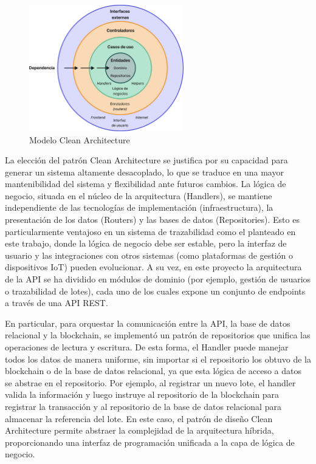 \begin{figure}[!htb]
\centering
\includegraphics[width=0.6\textwidth]{Figures/clean-architecture.png}
\caption{Modelo Clean Architecture}
\label{fig:clean-architecture}
\end{figure}

La elección del patrón Clean Architecture se justifica por su capacidad para generar un sistema altamente desacoplado, lo que se traduce en una mayor mantenibilidad del sistema y flexibilidad ante futuros cambios. La lógica de negocio, situada en el núcleo de la arquitectura (Handlers), se mantiene independiente de las tecnologías de implementación (infraestructura), la presentación de los datos (Routers) y las bases de datos (Repositories). Esto es particularmente ventajoso en un sistema de trazabilidad como el planteado en este trabajo, donde la lógica de negocio debe ser estable, pero la interfaz de usuario y las integraciones con otros sistemas (como plataformas de gestión o dispositivos IoT) pueden evolucionar. A su vez, en este proyecto la arquitectura de la API se ha dividido en módulos de dominio (por ejemplo, gestión de usuarios o trazabilidad de lotes), cada uno de los cuales expone un conjunto de endpoints a través de una API REST.

En particular, para orquestar la comunicación entre la API, la base de datos relacional y la blockchain, se implementó un patrón de repositorios que unifica las operaciones de lectura y escritura. De esta forma, el Handler puede manejar todos los datos de manera uniforme, sin importar si el repositorio los obtuvo de la blockchain o de la base de datos relacional, ya que esta lógica de acceso a datos se abstrae en el repositorio. Por ejemplo, al registrar un nuevo lote, el handler valida la información y luego instruye al repositorio de la blockchain para registrar la transacción y al repositorio de la base de datos relacional para almacenar la referencia del lote. En este caso, el patrón de diseño Clean Architecture permite abstraer la complejidad de la arquitectura híbrida, proporcionando una interfaz de programación unificada a la capa de lógica de negocio.

